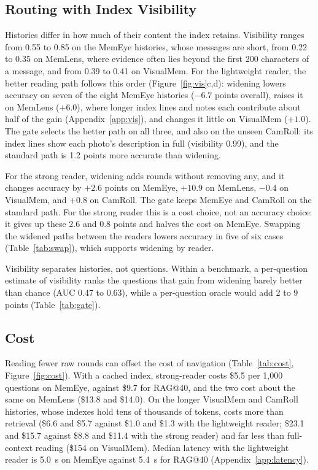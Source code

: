 \subsection{Routing with Index Visibility}
\label{sec:res-vis}

Histories differ in how much of their content the index retains. Visibility ranges from 0.55 to 0.85 on the MemEye histories, whose messages are short, from 0.22 to 0.35 on MemLens, where evidence often lies beyond the first 200 characters of a message, and from 0.39 to 0.41 on VisualMem. For the lightweight reader, the better reading path follows this order (Figure~\ref{fig:vis}c,d): widening lowers accuracy on seven of the eight MemEye histories ($-6.7$ points overall), raises it on MemLens ($+6.0$), where longer index lines and notes each contribute about half of the gain (Appendix~\ref{app:vis}), and changes it little on VisualMem ($+1.0$). The gate selects the better path on all three, and also on the unseen CamRoll: its index lines show each photo's description in full (visibility 0.99), and the standard path is 1.2 points more accurate than widening.

For the strong reader, widening adds rounds without removing any, and it changes accuracy by $+2.6$ points on MemEye, $+10.9$ on MemLens, $-0.4$ on VisualMem, and $+0.8$ on CamRoll. The gate keeps MemEye and CamRoll on the standard path. For the strong reader this is a cost choice, not an accuracy choice: it gives up these 2.6 and 0.8 points and halves the cost on MemEye. Swapping the widened paths between the readers lowers accuracy in five of six cases (Table~\ref{tab:swap}), which supports widening by reader.

Visibility separates histories, not questions. Within a benchmark, a per-question estimate of visibility ranks the questions that gain from widening barely better than chance (AUC 0.47 to 0.63), while a per-question oracle would add 2 to 9 points (Table~\ref{tab:gate}).

\subsection{Cost}
\label{sec:res-cost}


Reading fewer raw rounds can offset the cost of navigation (Table~\ref{tab:cost}, Figure~\ref{fig:cost}). With a cached index, strong-reader \vgs{} costs \$5.5 per 1,000 questions on MemEye, against \$9.7 for RAG@40, and the two cost about the same on MemLens (\$13.8 and \$14.0). On the longer VisualMem and CamRoll histories, whose indexes hold tens of thousands of tokens, \vgs{} costs more than retrieval (\$6.6 and \$5.7 against \$1.0 and \$1.3 with the lightweight reader; \$23.1 and \$15.7 against \$8.8 and \$11.4 with the strong reader) and far less than full-context reading (\$154 on VisualMem). Median latency with the lightweight reader is 5.0~s on MemEye against 5.4~s for RAG@40 (Appendix~\ref{app:latency}).
